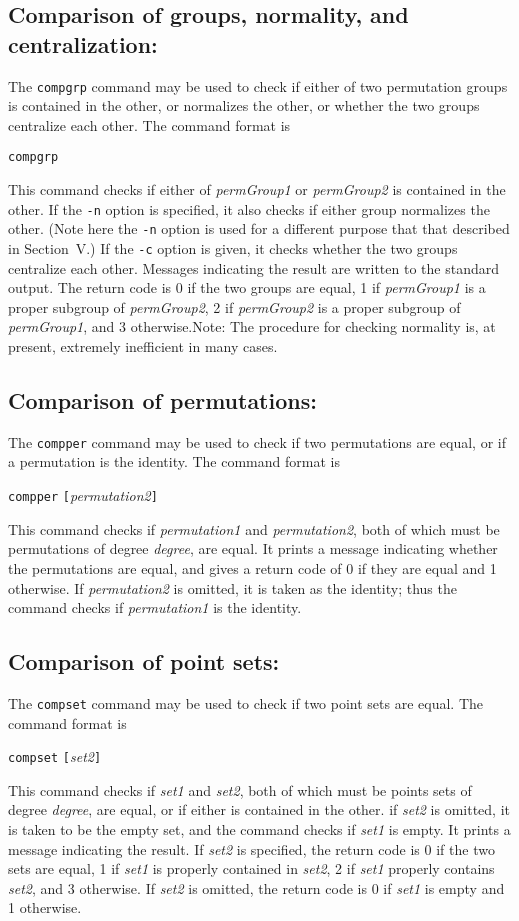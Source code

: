 \subsection{Comparison of groups, normality, and centralization:}The {\tt compgrp} command may be
used to check if either of two permutation groups is contained
in the other, or normalizes the other, or whether the two groups
centralize each other.  The command format is
%
\smallskip
\centerline{{\tt compgrp}\quad [{\tt -c}] \enskip[{\tt -n}]\enskip
            [{\tt -mb:}$k$]\enskip [{\tt -mw:}$w$]\enskip
            [{\tt -p:}{\it path\/}]}
\smallskip
This command checks if either of {\it permGroup1\/} or {\it permGroup2\/} is contained
in the other.  If the {\tt -n} option is specified, it also checks if
either group normalizes the other.  (Note here the {\tt -n} option is used
for a different purpose that that described in Section~V.)  If the {\tt -c} option is given, it
checks whether the two groups centralize each other.  Messages indicating the result are
written to the standard output.   The return code is 0 if the two groups
are equal, 1 if {\it permGroup1\/} is a proper subgroup of {\it permGroup2\/},
2 if {\it permGroup2\/} is a proper subgroup of {\it permGroup1\/}, and 3
otherwise.\quad  Note:  The procedure for checking normality
is, at present, extremely inefficient in many cases.
%
%
%
\subsection{Comparison of permutations:}The {\tt compper} command may be
used to check if two permutations are equal, or if a permutation is the
identity.  The command format is
%
\smallskip
\centerline{{\tt compper}\quad 
            {\tt [}{\it permutation2\/}{\tt ]}}
\smallskip
This command checks if {\it permutation1\/} and {\it permutation2}, both of
which must be permutations of degree {\it degree}, are equal.  It prints a
message indicating whether the permutations are equal, and gives a return
code of 0 if they are equal and 1 otherwise.  If {\it permutation2\/} is
omitted, it is taken as the identity; thus the command checks if
{\it permutation1\/} is the identity.
%
%
%
\subsection{Comparison of point sets:}The {\tt compset} command may be
used to check if two point sets are equal.  The command format is
%
\smallskip
\centerline{{\tt compset}\quad 
            {\tt [}{\it set2\/}{\tt ]}}
\smallskip
This command checks if {\it set1\/} and {\it set2}, both of
which must be points sets of degree {\it degree}, are equal, or if either
is contained in the other.  if {\it set2\/} is omitted, it is taken to be
the empty set, and the command checks if {\it set1\/} is empty.  It prints a
message indicating the result.  If {\it set2\/} is specified, the return code is 0 if
the two sets are equal, 1 if {\it set1\/} is properly contained in {\it set2\/}, 
2 if {\it set1\/} properly contains {\it set2\/}, and 3 otherwise.
If {\it set2\/} is omitted, the return code is 0 if {\it set1\/} is empty
and 1 otherwise.
%
%
